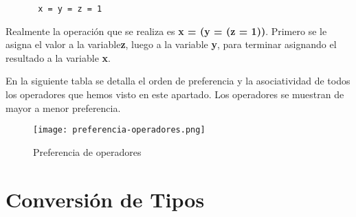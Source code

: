 \begin{figure}[H]
    \begin{tcolorbox}[sharp corners, colback=yellow!30, colframe=white!20]
        \scriptsize
\begin{verbatim}
 x = y = z = 1
\end{verbatim}
    \end{tcolorbox}
\end{figure}

Realmente la operación que se realiza es \textbf{x = (y = (z = 1))}. Primero se le asigna el valor a la variable\textbf{z}, luego a la variable \textbf{y}, para terminar asignando el resultado a la variable \textbf{x}.

En la siguiente tabla se detalla el orden de preferencia y la asociatividad de todos los operadores que hemos visto en este apartado. Los operadores se muestran de mayor a menor preferencia.

\begin{figure}[H]
    \centering
    \texttt{[image: preferencia-operadores.png]}
    \caption{Preferencia de operadores}
\end{figure}

\section{Conversión de Tipos}





